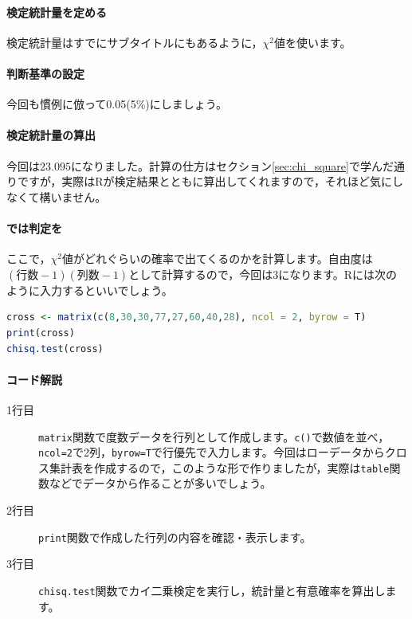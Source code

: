 \documentclass{ltjsbook}
\begin{document}
\paragraph{検定統計量を定める}

検定統計量はすでにサブタイトルにもあるように，$\chi^2$値を使います。

\paragraph{判断基準の設定}
今回も慣例に倣って0.05(5\%)にしましょう。

\paragraph{検定統計量の算出}

今回は$23.095$になりました。計算の仕方はセクション\ref{sec:chi_square}で学んだ通りですが，実際はRが検定結果とともに算出してくれますので，それほど気にしなくて構いません。

\paragraph{では判定を}

ここで，$\chi^2$値がどれぐらいの確率で出てくるのかを計算します。自由度は$(行数-1)(列数-1)$として計算するので，今回は$3$になります。Rには次のように入力するといいでしょう。


\begin{lstlisting}[language=R,label={code:13_01},caption={クロス集計表の検定結果をRで計算する}]
cross <- matrix(c(8,30,30,77,27,60,40,28), ncol = 2, byrow = T) 
print(cross)
chisq.test(cross)
\end{lstlisting}

\paragraph{コード解説}
\begin{description}
    \item[1行目] \verb|matrix|関数で度数データを行列として作成します。\verb|c()|で数値を並べ，\verb|ncol=2|で2列，\verb|byrow=T|で行優先で入力します。今回はローデータからクロス集計表を作成するので，このような形で作りましたが，実際は\verb|table|関数などでデータから作ることが多いでしょう。
    \item[2行目] \verb|print|関数で作成した行列の内容を確認・表示します。
    \item[3行目] \verb|chisq.test|関数でカイ二乗検定を実行し，統計量と有意確率を算出します。
\end{description}
\end{document}
